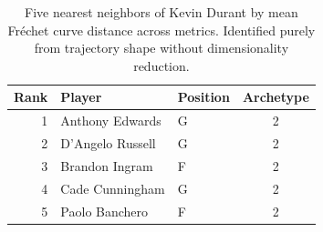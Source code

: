 \begin{table}[htbp]
  \centering\small
  \begin{tabular}{rllc}
    \toprule
    Rank & Player & Position & Archetype \\
    \midrule
    1 & Anthony Edwards & G & 2 \\
    2 & D'Angelo Russell & G & 2 \\
    3 & Brandon Ingram & F & 2 \\
    4 & Cade Cunningham & G & 2 \\
    5 & Paolo Banchero & F & 2 \\
    \bottomrule
  \end{tabular}
  \caption{Five nearest neighbors of Kevin Durant by mean Fr\'{e}chet curve distance across metrics. Identified purely from trajectory shape without dimensionality reduction.}
  \label{tab:Kevin_Durant_frechet_curve_neighbors}
\end{table}


